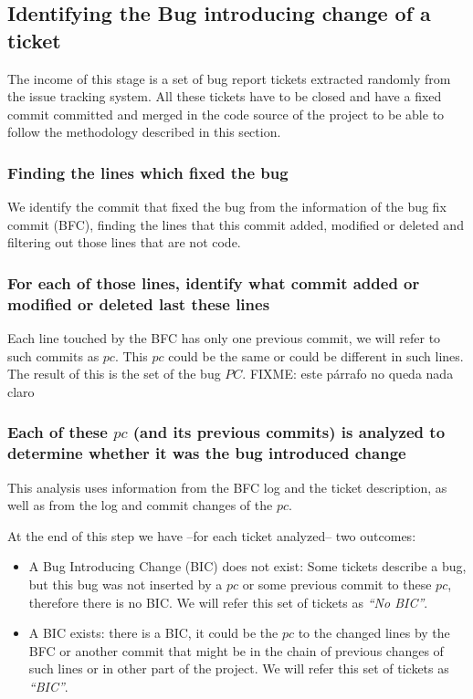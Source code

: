 \documentclass[conference]{IEEEtran}
\begin{document}
\subsection{Identifying the Bug introducing change of a ticket}
\label{sec:methodologySS}

The income of this stage is a set of bug report tickets extracted randomly from the issue tracking system.
All these tickets have to be closed and have a fixed commit committed and merged in the code source of the project to be able to follow the methodology described in this section.

\subsubsection{Finding the lines which fixed the bug}

We identify the commit that fixed the bug from the information of the bug fix commit (BFC), finding the lines that this commit added, modified or deleted and filtering out those lines that are not code.
	
\subsubsection{For each of those lines, identify what commit added or modified or deleted last these lines}

Each line touched by the BFC has only one previous commit, we will refer to such commits as $pc$.
This $pc$ could be the same or could be different in such lines.
The result of this is the set of the bug $PC$. FIXME: este párrafo no queda nada claro

\subsubsection{Each of these $pc$ (and its previous commits) is analyzed to determine whether it was the bug introduced change}

This analysis uses information from the BFC log and the ticket description, as well as from the log and commit changes of the $pc$.

At the end of this step we have --for each ticket analyzed-- two outcomes:
\begin{itemize}
	\item A Bug Introducing Change (BIC) does not exist: Some tickets describe a bug, but this bug was not inserted by a $pc$ or some previous commit to these $pc$, therefore there is no BIC. We will refer this set of tickets as \textit{``No BIC''}.
	\item A BIC exists: there is a BIC, it could be the $pc$ to the changed lines by the BFC or another commit that might be in the chain of previous changes of such lines or in other part of the project. We will refer this set of tickets as \textit{``BIC''}. 
\end{itemize}
\end{document}
